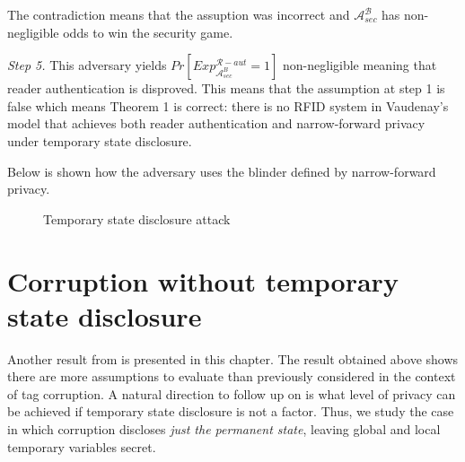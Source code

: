     The contradiction means that the assuption was incorrect and $\mathcal{A}_{sec}^{\mathcal{B}}$ has non-negligible odds to win the security game.

    \textit{Step 5.} This adversary yields $Pr[Exp_{\mathcal{A}_{sec}^{B}}^{\mathcal{R}-aut} = 1]$ non-negligible meaning that reader authentication is disproved. 
    This means that the assumption at step 1 is false which means Theorem 1 is correct: there is no RFID system in Vaudenay's model that achieves both reader authentication and narrow-forward privacy 
    under temporary state disclosure.

    Below is shown how the adversary uses the blinder defined by narrow-forward privacy.

    \begin{figure}[h!]

    \hspace*{0cm}
    \caption{Temporary state disclosure attack}
    \end{figure}

\section{Corruption without temporary state disclosure}

    Another result from \cite{Impossibility_results} is presented in this chapter. 
    The result obtained above shows there are more assumptions to evaluate than
    previously considered in the context of tag corruption. A natural direction
    to follow up on is what level of privacy can be achieved if temporary state
    disclosure is not a factor. Thus, we study the case in which corruption discloses 
    \textit{just the permanent state}, leaving global and local temporary variables
    secret.

